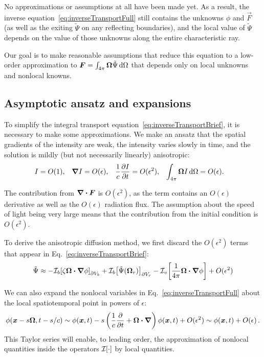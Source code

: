 No approximations or assumptions at all have been made yet. As a
result, the inverse equation~\eqref{eq:inverseTransportFull} still contains
the unknowns $\phi$ and $\vec{F}$ (as well as the exiting $\tilde\Psi$ on
any reflecting boundaries), and the local value of
$\tilde\Psi$ depends on the value of those unknowns along the entire
characteristic ray.

Our goal is to make reasonable assumptions that reduce this equation to a
low-order approximation to $\bm{F}=\int_{4\pi}\bm{\Omega} \tilde\Psi
\mathop{}\!\mathrm{d}\Omega$ that
depends only on local unknowns and nonlocal knowns.

\subsection{Asymptotic ansatz and expansions}
To simplify the integral transport
equation~\eqref{eq:inverseTransportBrief}, it is necessary to make some
approximations. We make an ansatz that the spatial gradients of the intensity
are weak, the intensity varies slowly in time, and the solution is mildly
(but not necessarily linearly) anisotropic:
\begin{align} \label{eq:ansatz}
  I &= O(1), &
  \bm{\nabla} I &= O(\epsilon), &
  \frac{1}{c}\frac{\partial I}{\partial t} &= O(\epsilon^2), &
  \int_{4\pi} \bm{\Omega} I\mathop{}\!\mathrm{d}\Omega &= O(\epsilon).
\end{align}

The contribution from $\bm{\nabla} \bm{\cdot}\bm{F}$ is $O(\epsilon^2)$, as the term
contains an $O(\epsilon)$ derivative as well as the $O(\epsilon)$ radiation
flux.  The assumption about the speed of light being very large means that the
contribution from the initial condition is $O(\epsilon^2)$.

To derive the anisotropic diffusion method, we first discard the $O(\epsilon^2)$
terms that appear in Eq.~\eqref{eq:inverseTransportBrief}:
\begin{equation} \label{eq:approxPsi1}
  \tilde\Psi \approx 
  -\mathcal{I}_{b}\!\left[\zeta \bm{\Omega}\bm{\cdot} \bm{\nabla} \phi\right]_{\partial V_b}
  + \mathcal{I}_{b}\!\left[\tilde\Psi(\bm{\Omega}_r)\right]_{\partial V_r}
  - \mathcal{I}_{v}\!\left[\frac{1}{4\pi} \bm{\Omega}\bm{\cdot} \bm{\nabla} \phi\right]
  + O(\epsilon^2)
\end{equation}

We can also expand the nonlocal variables in Eq.~\eqref{eq:inverseTransportFull}
about the local spatiotemporal point in powers of $\epsilon$:
\begin{equation} \label{eq:taylorPhi}
  \phi(\bm{x} - s \bm{\Omega}, t-s/c)
  \sim \phi(\bm{x},t) - s \left( \frac{1}{c} \frac{\partial }{\partial t} + \bm{\Omega} \bm{\cdot}
  \bm{\nabla}  \right) \phi (\bm{x}, t) + O(\epsilon^2) \sim \phi(\bm{x},t) +
  O(\epsilon) \,.
\end{equation}
This Taylor series will enable, to leading order, the approximation of nonlocal
quantities inside the operators $\mathcal{I}_{}\!\left[\cdot\right]$ by local quantities.

